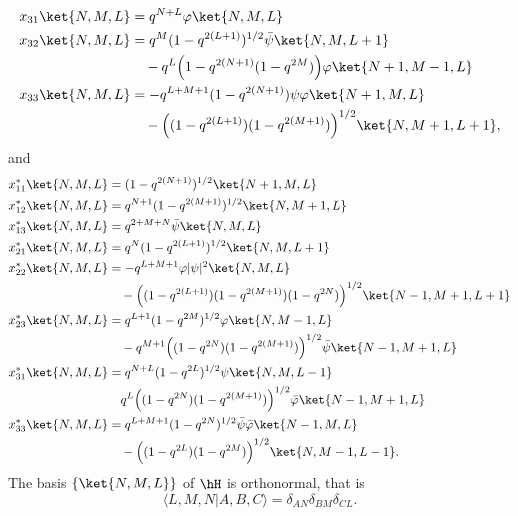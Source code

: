 \begin{theorem}
\begin{subequations}
\begin{align}
			x_{31}\ket{N,M,L} & =q^{N+L}\varphi\ket{N,M,L}                                                  \\
			x_{32}\ket{N,M,L} & =q^M(1-q^{2(L+1)})^{1/2}\bar\psi\ket{N,M,L+1}                               \\&\quad-q^L\Big( 1-q^{2(N+1)}(1-q^{2M}) \Big)\varphi\ket{N+1,M-1,L}\\
			x_{33}\ket{N,M,L} & =-q^{L+M+1}(1-q^{2(N+1)})\psi\varphi\ket{N+1,M,L}                           \\&\quad-\Big( (1-q^{2(L+1)})(1-q^{2(M+1)}) \Big)^{1/2}\ket{N,M+1,L+1},
		\end{align}
	\end{subequations}
	and
	\begin{subequations}
		\begin{align}
			x_{11}^*\ket{N,M,L} & =(1-q^{2(N+1)})^{1/2}\ket{N+1,M,L}                         \\
			x_{12}^*\ket{N,M,L} & =q^{N+1}(1-q^{2(M+1)})^{1/2}\ket{N,M+1,L}                  \\
			x_{13}^*\ket{N,M,L} & =q^{2+M+N}\bar\psi\ket{N,M,L}                              \\
			x_{21}^*\ket{N,M,L} & =q^N(1-q^{2(L+1)})^{1/2}\ket{N,M,L+1}                      \\
			x_{22}^*\ket{N,M,L} & =-q^{L+M+1}\varphi| \psi |^2\ket{N,M,L}                    \\&\quad -\Big( (1-q^{2(L+1)})(1-q^{2(M+1)})(1-q^{2N}) \Big)^{1/2}\ket{N-1,M+1,L+1}\\
			x_{23}^*\ket{N,M,L} & =q^{L+1}(1-q^{2M})^{1/2}\varphi\ket{N,M-1,L}               \\&\quad -q^{M+1}\Big( (1-q^{2N})(1-q^{2(M+1)}) \Big)^{1/2}\bar\psi\ket{N-1,M+1,L}\\
			x_{31}^*\ket{N,M,L} & =q^{N+L}(1-q^{2L})^{1/2}\psi\ket{N,M,L-1}                  \\&\quad q^L\Big( (1-q^{2N})(1-q^{2(M+1)}) \Big)^{1/2}\bar\varphi\ket{N-1,M+1,L}\\
			x_{33}^*\ket{N,M,L} & =q^{L+M+1}(1-q^{2N})^{1/2}\bar\psi\bar\varphi\ket{N-1,M,L} \\&\quad -\Big( (1-q^{2L})(1-q^{2M}) \Big)^{1/2}\ket{N,M-1,L-1}.
		\end{align}
	\end{subequations}
	The basis \(\{ \ket{N,M,L} \}\) of \( \hH\) is orthonormal, that is
	\begin{equation}
		\langle L,M,N|A,B,C\rangle = \delta_{AN}\delta_{BM}\delta_{CL}.
	\end{equation}
\end{theorem}


